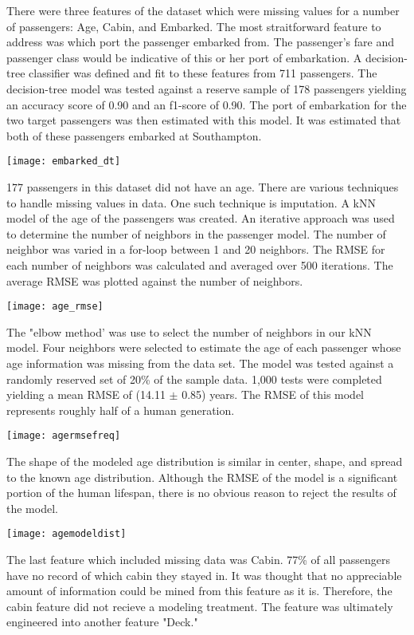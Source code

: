 \documentclass[10pt]{article}
\begin{document}
\begin{multicols}{2}
	There were three features of the dataset which were missing values for a number of passengers: Age, Cabin, and Embarked.
	The most straitforward feature to address was which port the passenger embarked from.
	The passenger's fare and passenger class would be indicative of this or her port of embarkation.
	A decision-tree classifier was defined and fit to these features from 711 passengers.
	The decision-tree model was tested against a reserve sample of 178 passengers yielding an accuracy score of 0.90 and an f1-score of 0.90.
	The port of embarkation for the two target passengers was then estimated with this model.
	It was estimated that both of these passengers embarked at Southampton.\\
	\begin{center}
	\texttt{[image: embarked\_dt]}\\
	\end{center}
	177 passengers in this dataset did not have an age.
	There are various techniques to handle missing values in data.
	One such technique is imputation.
	A kNN model of the age of the passengers was created.
	An iterative approach was used to determine the number of neighbors in the passenger model.
	The number of neighbor was varied in a for-loop between 1 and 20 neighbors.
	The RMSE for each number of neighbors was calculated and averaged over 500 iterations.
	The average RMSE was plotted against the number of neighbors.
	\begin{center}	
	\texttt{[image: age\_rmse]}\\
	\end{center}
	The "elbow method' was use to select the number of neighbors in our kNN model.
	Four neighbors were selected to estimate the age of each passenger whose age information was missing from the data set.
	The model was tested against a randomly reserved set of 20\% of the sample data.
	1,000 tests were completed yielding a mean RMSE of (14.11 $\pm$ 0.85) years.
	The RMSE of this model represents roughly half of a human generation.
	\begin{center}
	\texttt{[image: agermsefreq]}\\
	\end{center}
	The shape of the modeled age distribution is similar in center, shape, and spread to the known age distribution.
	Although the RMSE of the model is a significant portion of the human lifespan, there is no obvious reason to reject the results of the model.
	\begin{center}
	\texttt{[image: agemodeldist]}\\
	\end{center}
	The last feature which included missing data was Cabin.
	77\% of all passengers have no record of which cabin they stayed in.
	It was thought that no appreciable amount of information could be mined from this feature as it is.
	Therefore, the cabin feature did not recieve a modeling treatment.
	The feature was ultimately engineered into another feature "Deck."


\end{multicols}
\end{document}
